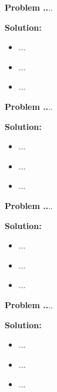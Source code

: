 \documentclass{article}
\theoremstyle{problemstyle}
\newenvironment{boxedproblem}[1]
{\begin{tcolorbox}[colback=white, colframe=black, boxrule=0.5pt]\noindent\textbf{Problem #1.}}
{\end{tcolorbox}}
\begin{document}
    
    \begin{boxedproblem}{16}
    ...
    \end{boxedproblem}
    
    \textbf{Solution:}
    \begin{itemize}[label={},leftmargin=1.25cm,nosep]
        \item ...
        \item ...
        \item ...
    \end{itemize}
    
    
    \begin{boxedproblem}{17}
    ...
    \end{boxedproblem}
    
    \textbf{Solution:}
    \begin{itemize}[label={},leftmargin=1.25cm,nosep]
        \item ...
        \item ...
        \item ...
    \end{itemize}
    
    
    \begin{boxedproblem}{18}
    ...
    \end{boxedproblem}
    
    \textbf{Solution:}
    \begin{itemize}[label={},leftmargin=1.25cm,nosep]
        \item ...
        \item ...
        \item ...
    \end{itemize}
    
    
    \begin{boxedproblem}{19}
    ...
    \end{boxedproblem}
    
    \textbf{Solution:}
    \begin{itemize}[label={},leftmargin=1.25cm,nosep]
        \item ...
        \item ...
        \item ...
    \end{itemize}
    
\end{document}
